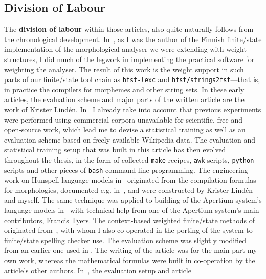 \documentclass[officiallayout]{unihelcompling}
\begin{document}
\subsection{Division of Labour}
\label{subsec:division-of-labour}

The \textbf{division of labour} within those articles, also quite naturally
follows from the chronological development.
In~, as I was the author
of the Finnish finite\-/state implementation of the morphological analyser we
were extending with weight structures, I did much of the legwork in
implementing the practical software for weighting the analyser. The result of
this work is the weight support in such parts of our finite\-/state tool chain
as \texttt{hfst-lexc} and \texttt{hfst\-/strings2fst}---that is, in practice
the compilers for morphemes and other string sets. In these early articles, the
evaluation scheme and major parts of the written article are the work of
Krister Lindén.  In~ I already take into
account that previous experiments were performed using commercial corpora
unavailable for scientific, free and open-source work, which lead me to devise
a statistical training as well as an evaluation scheme based on
freely-available Wikipedia data. The evaluation and statistical training setup
that was built in this article has then evolved throughout the thesis, in the
form of collected \texttt{make} recipes, \texttt{awk} scripts, \texttt{python}
scripts and other pieces of \texttt{bash} command-line programming. The
engineering work on Hunspell language models
in~ originated from the
compilation formulas for morphologies, documented e.g.\/
in~\cite{linden2009hfst}, and were constructed by Krister Lindén and myself.
The same technique was applied to building of the Apertium system's language
models in~ with technical help from one of the
Apertium system's main contributors, Francis Tyers.  The context-based weighted
finite\-/state methods of  originated
from~\citet{silfverberg2010partofspeech}, with whom I also co-operated in the
porting of the system to finite\-/state spelling checker use. The evaluation
scheme was slightly modified from an earlier one used in
. The writing of the article
 was for the main part  my own work, whereas
the mathematical formulas were built in co-operation by the article's other
authors.  In~, the evaluation setup and article
\end{document}
